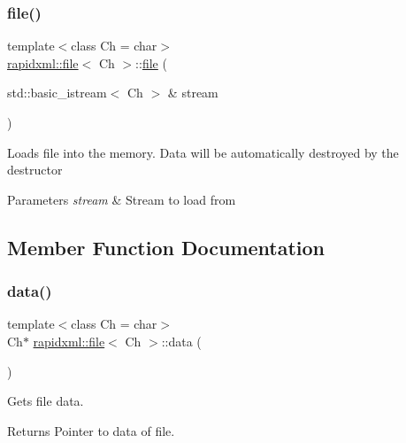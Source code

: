 \subsubsection{\texorpdfstring{file()}{file()}\hspace{0.1cm}{\footnotesize\ttfamily [2/2]}}
{\footnotesize\ttfamily template$<$class Ch  = char$>$ \\
\mbox{\hyperlink{classrapidxml_1_1file}{rapidxml\+::file}}$<$ Ch $>$\+::\mbox{\hyperlink{classrapidxml_1_1file}{file}} (\begin{DoxyParamCaption}\item[{std\+::basic\+\_\+istream$<$ Ch $>$ \&}]{stream }\end{DoxyParamCaption})\hspace{0.3cm}{\ttfamily [inline]}}

Loads file into the memory. Data will be automatically destroyed by the destructor
\begin{DoxyParams}{Parameters}
{\em stream} & Stream to load from \\
\hline
\end{DoxyParams}


\subsection{Member Function Documentation}
\mbox{\label{classrapidxml_1_1file_af1c71d65862c7af14e4708e32a80c1de}} 
\subsubsection{\texorpdfstring{data()}{data()}\hspace{0.1cm}{\footnotesize\ttfamily [1/2]}}
{\footnotesize\ttfamily template$<$class Ch  = char$>$ \\
Ch$\ast$ \mbox{\hyperlink{classrapidxml_1_1file}{rapidxml\+::file}}$<$ Ch $>$\+::data (\begin{DoxyParamCaption}{ }\end{DoxyParamCaption})\hspace{0.3cm}{\ttfamily [inline]}}

Gets file data. \begin{DoxyReturn}{Returns}
Pointer to data of file. 
\end{DoxyReturn}
\mbox{\label{classrapidxml_1_1file_a044bdd99e59157b8a5a1b28c2f32da4d}} 
